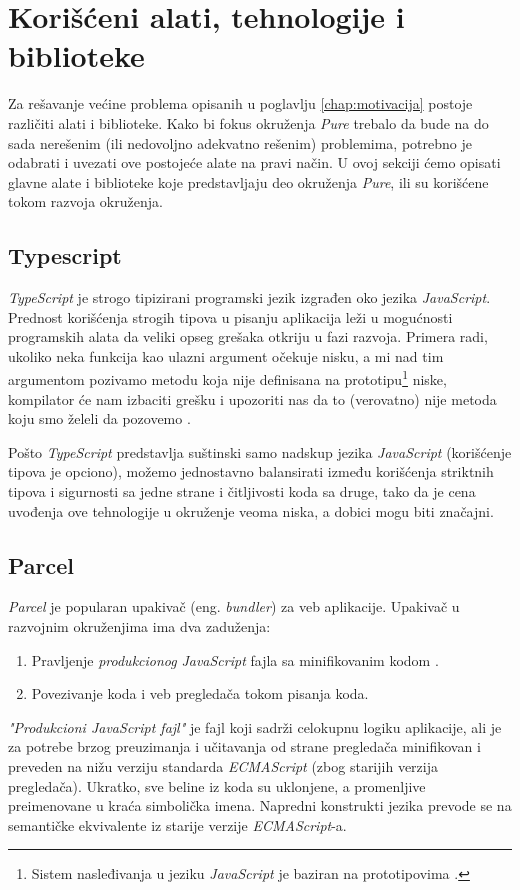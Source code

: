 \documentclass[12pt,oneside]{memoir}
\begin{document}
\section{Korišćeni alati, tehnologije i biblioteke}
Za rešavanje većine problema opisanih u poglavlju \ref{chap:motivacija} postoje različiti alati i biblioteke. 
Kako bi fokus okruženja \emph{Pure} trebalo da bude na do sada nerešenim (ili nedovoljno adekvatno rešenim) problemima,
potrebno je odabrati i uvezati ove postojeće alate na pravi način. U ovoj sekciji ćemo opisati glavne
alate i biblioteke koje predstavljaju deo okruženja \emph{Pure}, ili su korišćene tokom razvoja okruženja.

\subsection{Typescript}
\emph{TypeScript} je strogo tipizirani programski jezik izgrađen oko jezika \emph{JavaScript}.
Prednost korišćenja strogih tipova u pisanju aplikacija leži u mogućnosti programskih alata
da veliki opseg grešaka otkriju u fazi razvoja. Primera radi, ukoliko neka funkcija kao ulazni
argument očekuje nisku,
a mi nad tim argumentom pozivamo metodu koja nije definisana na
prototipu\footnote{Sistem nasleđivanja u jeziku \emph{JavaScript}
je baziran na prototipovima \cite{PrototypeInheritance}.} niske,
kompilator će nam izbaciti grešku i upozoriti nas da to (verovatno) nije metoda koju smo želeli da pozovemo \cite{PrototypeInheritance}.

Pošto \emph{TypeScript} predstavlja suštinski samo nadskup jezika \emph{JavaScript} (korišćenje tipova je opciono),
možemo jednostavno balansirati između korišćenja striktnih tipova i sigurnosti sa jedne strane i čitljivosti koda sa druge,
tako da je cena uvođenja ove tehnologije u okruženje veoma niska, a dobici mogu biti značajni.
\subsection{Parcel}
\emph{Parcel} je popularan upakivač (eng. \emph{bundler}) za veb aplikacije.
Upakivač u razvojnim okruženjima ima dva zaduženja:
\begin{enumerate}
  \item Pravljenje \emph{produkcionog} \emph{JavaScript} fajla sa minifikovanim kodom \cite{Minification}.
  \item Povezivanje koda i veb pregledača tokom pisanja koda.
\end{enumerate} 
\emph{"Produkcioni JavaScript fajl"} je fajl koji sadrži celokupnu logiku aplikacije, ali je za potrebe brzog preuzimanja i
učitavanja od strane pregledača minifikovan i preveden na nižu verziju standarda \emph{ECMAScript} \cite{ECMAScript} (zbog starijih verzija pregledača).
Ukratko, sve beline iz koda su uklonjene, a promenljive preimenovane u kraća simbolička imena. Napredni konstrukti jezika
prevode se na semantičke ekvivalente iz starije verzije \emph{ECMAScript}-a.
\end{document}
